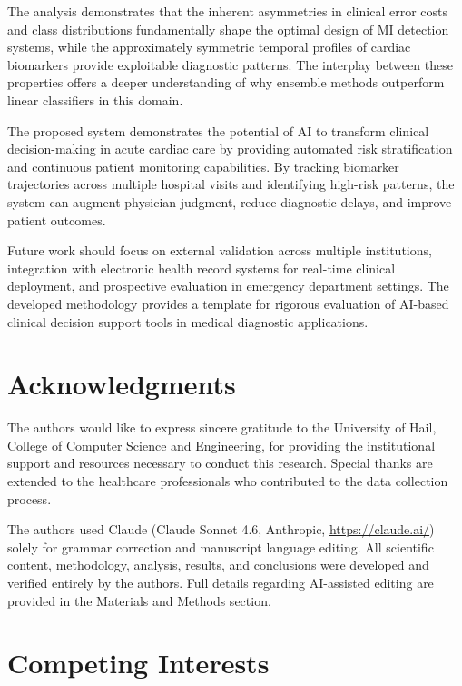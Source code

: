 \documentclass[fleqn,10pt,lineno]{wlpeerj}
\begin{document}
The analysis demonstrates that the inherent asymmetries in clinical error costs and class distributions fundamentally shape the optimal design of MI detection systems, while the approximately symmetric temporal profiles of cardiac biomarkers provide exploitable diagnostic patterns. The interplay between these properties offers a deeper understanding of why ensemble methods outperform linear classifiers in this domain.

The proposed system demonstrates the potential of AI to transform clinical decision-making in acute cardiac care by providing automated risk stratification and continuous patient monitoring capabilities. By tracking biomarker trajectories across multiple hospital visits and identifying high-risk patterns, the system can augment physician judgment, reduce diagnostic delays, and improve patient outcomes.

Future work should focus on external validation across multiple institutions, integration with electronic health record systems for real-time clinical deployment, and prospective evaluation in emergency department settings. The developed methodology provides a template for rigorous evaluation of AI-based clinical decision support tools in medical diagnostic applications.

\section*{Acknowledgments}

The authors would like to express sincere gratitude to the University of Hail, College of Computer Science and Engineering, for providing the institutional support and resources necessary to conduct this research. Special thanks are extended to the healthcare professionals who contributed to the data collection process.

The authors used Claude (Claude Sonnet 4.6, Anthropic, \url{https://claude.ai/}) solely for grammar correction and manuscript language editing. All scientific content, methodology, analysis, results, and conclusions were developed and verified entirely by the authors. Full details regarding AI-assisted editing are provided in the Materials and Methods section.

\section*{Competing Interests}
\end{document}

